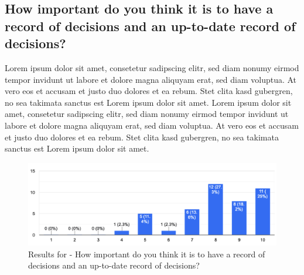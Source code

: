 \subsection{How important do you think it is to have a record of decisions and an up-to-date record of decisions?}
Lorem ipsum dolor sit amet, consetetur sadipscing elitr, sed diam nonumy eirmod tempor invidunt ut labore et dolore magna aliquyam erat, sed diam voluptua. At vero eos et accusam et justo duo dolores et ea rebum. Stet clita kasd gubergren, no sea takimata sanctus est Lorem ipsum dolor sit amet. Lorem ipsum dolor sit amet, consetetur sadipscing elitr, sed diam nonumy eirmod tempor invidunt ut labore et dolore magna aliquyam erat, sed diam voluptua. At vero eos et accusam et justo duo dolores et ea rebum. Stet clita kasd gubergren, no sea takimata sanctus est Lorem ipsum dolor sit amet.
\begin{figure}[h!]
\centering
\includegraphics[width=\linewidth]{Images/Survey/decisions_1.png}
\caption{Results for - How important do you think it is to have a record of decisions and an up-to-date record of decisions?}
\label{fig:results:decisions:1}
\end{figure}

